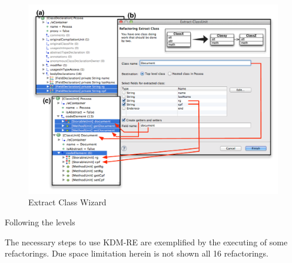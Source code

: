\begin{figure}[!ht]
\centering
  \includegraphics[scale=0.6]{figure/Wizard}
\caption{Extract Class Wizard}
\label{fig:wizard}
\end{figure}


Following the levels 

The necessary steps to use KDM-RE are exemplified by the executing of some refactorings. Due space limitation herein is not shown all 16 refactorings. 














